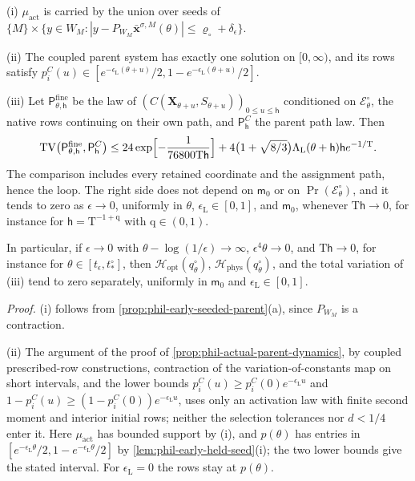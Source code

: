 (i) \(\mu_{\mathrm{act}}\) is carried by the union over seeds of
\(\{M\}\times\{y\in W_M:|y-P_{W_M}\bar{\mathbf x}^{\sigma,M}(\theta)|
\le\varrho_\circ+\delta_\epsilon\}\).

(ii) The coupled parent system has exactly one solution on \([0,\infty)\),
and its rows satisfy
\(p^C_i(u)\in[e^{-\epsilon_{\mathrm L}(\theta+u)}/2,
1-e^{-\epsilon_{\mathrm L}(\theta+u)}/2]\).

(iii) Let \(\mathsf P^{\mathrm{fine}}_{\theta,\mathsf h}\) be the law of
\((C(\mathbf X_{\theta+u},S_{\theta+u}))_{0\le u\le\mathsf h}\) conditioned on
\(\mathscr E^\circ_\theta\), the native rows continuing on their own path, and
\(\mathsf P^C_{\mathsf h}\) the parent path law. Then
\[
 \operatorname{TV}\bigl(\mathsf P^{\mathrm{fine}}_{\theta,\mathsf h},
                        \mathsf P^C_{\mathsf h}\bigr)
 \le24\exp\Bigl[-\frac1{76800\mathrm T\mathsf h}\Bigr]
 +4\bigl(1+\sqrt{8/3}\bigr)\Lambda_{\mathrm L}(\theta+\mathsf h)
   \mathsf he^{-1/\mathrm T}.
\]
The comparison includes every retained coordinate and the assignment path,
hence the loop. The right side does not depend on \(\mathsf m_0\) or on
\(\Pr(\mathscr E^\circ_\theta)\), and it tends to zero as \(\epsilon\to0\),
uniformly in \(\theta\), \(\epsilon_{\mathrm L}\in[0,1]\), and
\(\mathsf m_0\), whenever \(\mathrm T\mathsf h\to0\), for instance for
\(\mathsf h=\mathrm T^{-1+\mathrm q}\) with \(\mathrm q\in(0,1)\).

In particular, if \(\epsilon\to0\) with \(\theta-\log(1/\epsilon)\to\infty\),
\(\epsilon^4\theta\to0\), and \(\mathrm T\mathsf h\to0\), for instance for
\(\theta\in[t_\epsilon,t^\circ_*]\), then
\(\mathcal H_{\mathrm{opt}}(q^\circ_\theta)\),
\(\mathcal H_{\mathrm{phys}}(q^\circ_\theta)\), and the total variation of
(iii) tend to zero separately, uniformly in \(\mathsf m_0\) and
\(\epsilon_{\mathrm L}\in[0,1]\).

\noindent\emph{Proof.}
(i) follows from \cref{prop:phil-early-seeded-parent}(a), since \(P_{W_M}\)
is a contraction.

(ii) The argument of the proof of \cref{prop:phil-actual-parent-dynamics},
by coupled prescribed-row constructions, contraction of the
variation-of-constants map on short intervals, and the lower bounds
\(p^C_i(u)\ge p^C_i(0)e^{-\epsilon_{\mathrm L}u}\) and
\(1-p^C_i(u)\ge(1-p^C_i(0))e^{-\epsilon_{\mathrm L}u}\), uses only an
activation law with finite second moment and interior initial rows; neither
the selection tolerances nor \(d<1/4\) enter it. Here \(\mu_{\mathrm{act}}\)
has bounded support by (i), and \(p(\theta)\) has entries in
\([e^{-\epsilon_{\mathrm L}\theta}/2,1-e^{-\epsilon_{\mathrm L}\theta}/2]\) by
\cref{lem:phil-early-held-seed}(i); the two lower bounds give the stated
interval. For \(\epsilon_{\mathrm L}=0\) the rows stay at \(p(\theta)\).

